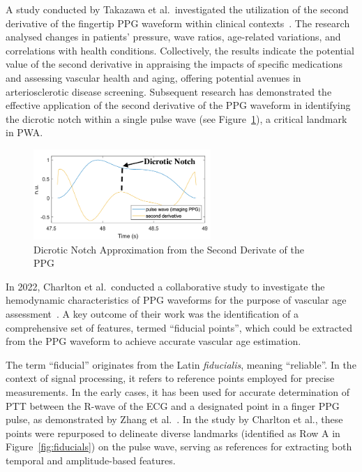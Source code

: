 A study conducted by Takazawa et al.\ investigated the utilization of the second derivative of the fingertip PPG waveform within clinical contexts~\cite{takazawaAssessmentVasoactiveAgents1998a}.
The research analysed changes in patients' pressure, wave ratios, age-related variations, and correlations with health conditions.
Collectively, the results indicate the potential value of the second derivative in appraising the impacts of specific medications and assessing vascular health and aging, offering potential avenues in arteriosclerotic disease screening.
Subsequent research has demonstrated the effective application of the second derivative of the PPG waveform in identifying the dicrotic notch within a single pulse wave (see Figure~\ref{fig:dic_notch}), a critical landmark in PWA\@.

\begin{figure}[b]
    \centering
    \includegraphics[width=0.6\textwidth]{images/sp/dic_notch}
    \caption{Dicrotic Notch Approximation from the Second Derivate of the PPG~\cite{djeldjliImagingPhotoplethysmographySignal2019}}
    \label{fig:dic_notch}
\end{figure}

In 2022, Charlton et al.\ conducted a collaborative study to investigate the hemodynamic characteristics of PPG waveforms for the purpose of vascular age assessment~\cite{charltonAssessingHemodynamicsPhotoplethysmogram2022}.
A key outcome of their work was the identification of a comprehensive set of features, termed \enquote{fiducial points}, which could be extracted from the PPG waveform to achieve accurate vascular age estimation.

The term \enquote{fiducial} originates from the Latin \textit{fiducialis}, meaning \enquote{reliable}.
In the context of signal processing, it refers to reference points employed for precise measurements.
In the early cases, it has been used for accurate determination of PTT between the R-wave of the ECG and a designated point in a finger PPG pulse, as demonstrated by Zhang et al.~\cite{zhangEffectLocalCold2005}.
In the study by Charlton et al., these points were repurposed to delineate diverse landmarks (identified as Row A in Figure~\ref{fig:fiducials}) on the pulse wave, serving as references for extracting both temporal and amplitude-based features.

